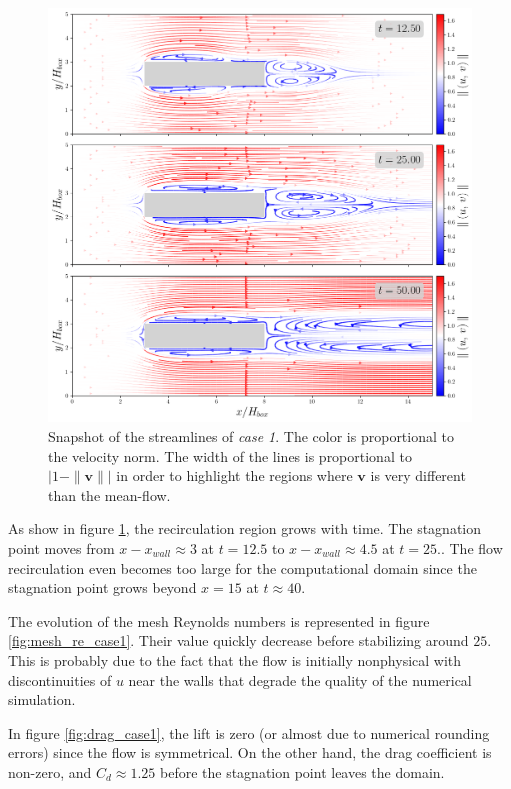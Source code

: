 \documentclass[11 pt]{article}
\begin{document}
\begin{figure}[H]
    \centering
    \includegraphics[width=\textwidth]{../figures/streamlines_case_1.png}
    \caption{Snapshot of the streamlines of \textit{case 1}. The color is proportional to the velocity norm. The width of the lines is proportional to $\left|1 - \|\mathbf{v}\|\right|$ in order to highlight the regions where $\mathbf{v}$ is very different than the mean-flow.}
    \label{fig:streamlines_1}
\end{figure}
As show in figure \ref{fig:streamlines_1}, the recirculation region grows with time. The stagnation point moves from $x-x_{wall} \approx 3$ at $t=12.5$ to $x - x_{wall} \approx 4.5$ at $t=25.$. The flow recirculation even becomes too large for the computational domain since the stagnation point grows beyond $x=15$ at $t \approx 40$.

The evolution of the mesh Reynolds numbers is represented in figure \ref{fig:mesh_re_case1}. Their value quickly decrease before stabilizing around $25$. This is probably due to the fact that the flow is initially nonphysical with discontinuities of $u$ near the walls that degrade the quality of the numerical simulation.

In figure \ref{fig:drag_case1}, the lift is zero (or almost due to numerical rounding errors) since the flow is symmetrical. On the other hand, the drag coefficient is non-zero, and $C_d \approx 1.25$ before the stagnation point leaves the domain.
\end{document}
